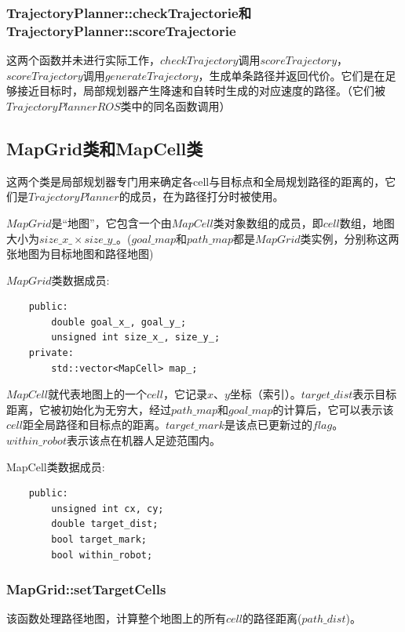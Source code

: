\documentclass[9pt, oneside]{book}
\begin{document}
\subsubsection{TrajectoryPlanner::checkTrajectorie和TrajectoryPlanner::scoreTrajectorie}

这两个函数并未进行实际工作，$checkTrajectory$调用$scoreTrajectory$，$scoreTrajectory$调用$generateTrajectory$，生成单条路径并返回代价。它们是在足够接近目标时，局部规划器产生降速和自转时生成的对应速度的路径。（它们被$TrajectoryPlannerROS$类中的同名函数调用）

\subsection{MapGrid类和MapCell类}

这两个类是局部规划器专门用来确定各cell与目标点和全局规划路径的距离的，它们是$TrajectoryPlanner$的成员，在为路径打分时被使用。

$MapGrid$是“地图”，它包含一个由$MapCell$类对象数组的成员，即$cell$数组，地图大小为$size\_x\_ × size\_y\_$。($goal\_map$和$path\_map$都是$MapGrid$类实例，分别称这两张地图为目标地图和路径地图)

$MapGrid$类数据成员:

\small
\begin{verbatim}
    public:
        double goal_x_, goal_y_; 
        unsigned int size_x_, size_y_; 
    private:
        std::vector<MapCell> map_; 
\end{verbatim}
\normalsize

$MapCell$就代表地图上的一个$cell$，它记录$x$、$y$坐标（索引）。$target\_dist$表示目标距离，它被初始化为无穷大，经过$path\_map$和$goal\_map$的计算后，它可以表示该$cell$距全局路径和目标点的距离。$target\_mark$是该点已更新过的$flag$。$within\_robot$表示该点在机器人足迹范围内。

MapCell类数据成员:

\small
\begin{verbatim}
    public:
        unsigned int cx, cy;
        double target_dist;
        bool target_mark;
        bool within_robot;
\end{verbatim}
\normalsize

\subsubsection{MapGrid::setTargetCells}

该函数处理路径地图，计算整个地图上的所有$cell$的路径距离($path\_dist$)。
\end{document}
